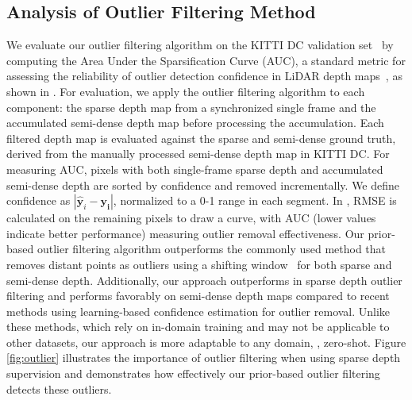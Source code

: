 \subsection{Analysis of Outlier Filtering Method}
We evaluate our outlier filtering algorithm on the KITTI DC validation set~\cite{uhrig2017sparsity}
by computing the Area Under the Sparsification Curve (AUC), a standard metric for assessing the reliability of outlier detection confidence in LiDAR depth maps~\cite{conti22confidence, ilg2018uncertainty}, as shown in . 
For evaluation, we apply the outlier filtering algorithm to each component: the sparse depth map from a synchronized single frame and the accumulated semi-dense depth map before processing the accumulation.
Each filtered depth map is evaluated against the sparse and semi-dense ground truth, derived from the manually processed semi-dense depth map in KITTI DC.
For measuring AUC, pixels with both single-frame sparse depth and accumulated semi-dense depth are sorted by confidence and removed incrementally. 
We define confidence as $|\hat{\mathbf{y}}_i-\mathbf{y_i}|$, normalized to a 0-1 range in each segment.
In , RMSE is calculated on the remaining pixels to draw a curve, with AUC (lower values indicate better performance) measuring outlier removal effectiveness.
Our prior-based outlier filtering algorithm outperforms the commonly used method that removes distant points as outliers using a shifting window~\cite{lopezrodriguez2020project, wong2021unsupervised} for both sparse and semi-dense depth.
Additionally, our approach outperforms in sparse depth outlier filtering and performs favorably on semi-dense depth maps compared to recent methods using learning-based confidence estimation for outlier removal.
Unlike these methods, which rely on in-domain training and may not be applicable to other datasets, our approach is more adaptable to any domain, \ie, zero-shot.
Figure \ref{fig:outlier} illustrates the importance of outlier filtering when using sparse depth supervision and demonstrates how effectively our prior-based outlier filtering detects these outliers.

